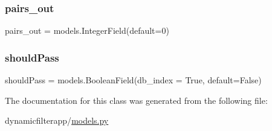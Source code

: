 \subsubsection{\texorpdfstring{pairs\+\_\+out}{pairs\_out}}
{\footnotesize\ttfamily pairs\+\_\+out = models.\+Integer\+Field(default=0)\hspace{0.3cm}{\ttfamily [static]}}

\mbox{\label{classdynamicfilterapp_1_1models_1_1_item_a1abc5225054f7c37dcefe2ca69594650}} 
\subsubsection{\texorpdfstring{should\+Pass}{shouldPass}}
{\footnotesize\ttfamily should\+Pass = models.\+Boolean\+Field(db\+\_\+index = True, default=False)\hspace{0.3cm}{\ttfamily [static]}}



The documentation for this class was generated from the following file\+:\begin{DoxyCompactItemize}
\item 
dynamicfilterapp/\mbox{\hyperlink{models_8py}{models.\+py}}\end{DoxyCompactItemize}
